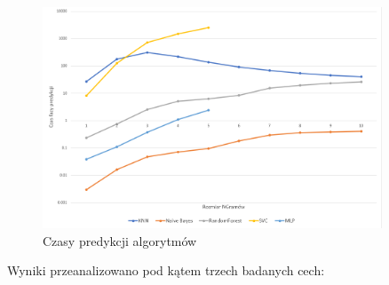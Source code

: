 \begin{figure}[h!]
    \centering
    \includegraphics[width=0.9\textwidth]{./Img/BOWPredict.png}
    \caption{Czasy predykcji algorytmów}
\end{figure}

Wyniki przeanalizowano pod kątem trzech badanych cech:

